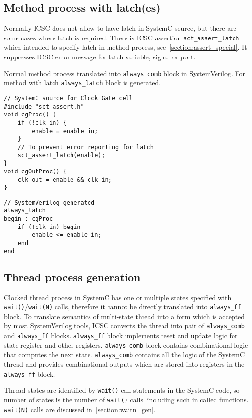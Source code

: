 \subsection{Method process with latch(es)}\label{section:method_latches}

Normally ICSC does not allow to have latch in SystemC source, but there are some cases where latch is required. There is ICSC assertion {\tt sct\_assert\_latch} which intended to specify latch in method process, see~\ref{section:assert_special}. It suppresses ICSC error message for latch variable, signal or port. 

Normal method process translated into {\tt always\_comb} block in SystemVerilog. For method with latch {\tt always\_latch} block is generated.

\begin{lstlisting}[style=mycpp]
// SystemC source for Clock Gate cell
#include "sct_assert.h"
void cgProc() {
    if (!clk_in) {
        enable = enable_in;
    }
    // To prevent error reporting for latch
    sct_assert_latch(enable);
}
void cgOutProc() {
    clk_out = enable && clk_in;
}
\end{lstlisting}
%
\begin{lstlisting}[style=myverilog]
// SystemVerilog generated 
always_latch
begin : cgProc
    if (!clk_in) begin
        enable <= enable_in;
    end
end
\end{lstlisting}

\subsection{Thread process generation}\label{section:thread_gen}

Clocked thread process in SystemC has one or multiple states specified with {\tt wait()}/{\tt wait(N)} calls, therefore it cannot be directly translated into {\tt always\_ff} block. 
To translate semantics of multi-state thread into a form which is accepted by most SystemVerilog tools, ICSC converts the thread into pair of {\tt always\_comb} and {\tt always\_ff} blocks. {\tt always\_ff} block implements reset and update logic for state register and other registers. {\tt always\_comb} block contains combinational logic that computes the next state. {\tt always\_comb} contains all the logic of the SystemC thread and provides combinational outputs which are stored into registers in the {\tt always\_ff} block. 

Thread states are identified by {\tt wait()} call statements in the SystemC code, so number of states is the number of {\tt wait()} calls, including such in called functions. {\tt wait(N)} calls are discussed in~\ref{section:waitn_gen}. 

